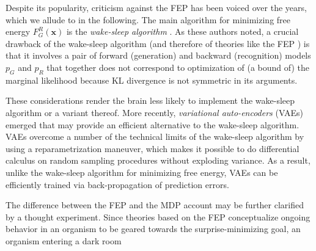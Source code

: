 \documentclass[10pt,letterpaper]{article}
\def\x{\mathbf{x}}
\begin{document}
Despite its popularity, criticism against the FEP has been voiced over the years,
which we allude to in the following.
The main algorithm for minimizing free energy $F_G^R(\x)$ is the \textit{wake-sleep algorithm}
\citep{dayan1995helmholtz}. As these authors noted,
a crucial drawback of the wake-sleep algorithm (and therefore of theories like the FEP \citep{friston2010free}) is that it involves a pair
of forward (generation) and backward (recognition) models $p_G$ and $p_R$ that
together does not correspond to optimization of (a bound of) the marginal likelihood
because KL divergence is not symmetric in its arguments.



These considerations render the brain less likely to implement the wake-sleep algorithm or a variant thereof. More recently,
\textit{variational auto-encoders} (VAEs) \citep{kingma2013auto} emerged that may provide an efficient alternative to the wake-sleep algorithm. VAEs
overcome a number of the technical limits of the wake-sleep algorithm
by using a reparametrization maneuver, which makes it possible to do differential calculus on random sampling procedures without exploding variance. As a result, unlike the wake-sleep algorithm
for minimizing free energy, VAEs can be efficiently trained via back-propagation of prediction errors.



The difference between the FEP and the MDP account may be further clarified by a thought experiment.
Since theories based on the FEP \citep{friston2010free,fristonAIorRL}
conceptualize ongoing behavior
in an organism to be geared towards the surprise-minimizing goal,
an organism entering a dark room

\end{document}
